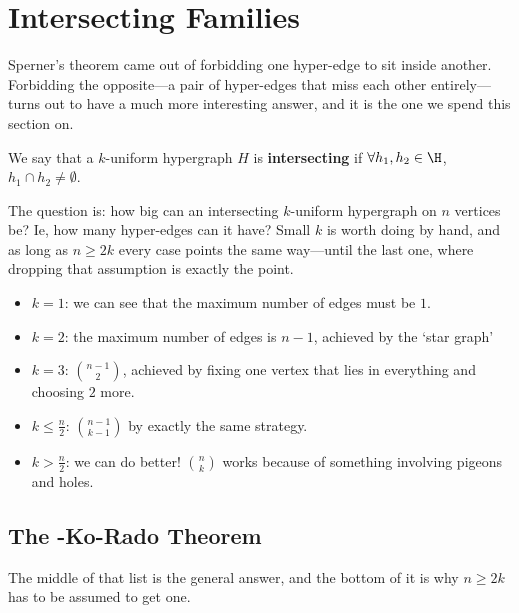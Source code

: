 \section{Intersecting Families}

Sperner's theorem came out of forbidding one hyper-edge to sit inside another. Forbidding the opposite---a pair of hyper-edges that miss each other entirely---turns out to have a much more interesting answer, and it is the one we spend this section on.

\begin{boxdefinition}[Intersecting]
    We say that a $k$-uniform hypergraph $H$ is \textbf{intersecting} if $\forall h_1, h_2 \in \H$, $h_1 \cap h_2 \ne \emptyset$.
\end{boxdefinition}

The question is: how big can an intersecting $k$-uniform hypergraph on $n$ vertices be? Ie, how many hyper-edges can it have? Small $k$ is worth doing by hand, and as long as $n \geq 2k$ every case points the same way---until the last one, where dropping that assumption is exactly the point.

\begin{itemize}
    \item $k = 1$: we can see that the maximum number of edges must be $1$.
    \item $k = 2$: the maximum number of edges is $n - 1$, achieved by the `star graph'
    \begin{center}
    \end{center}
    \item $k = 3$: $\binom{n-1}{2}$, achieved by fixing one vertex that lies in everything and choosing $2$ more.
    \item $k \leq \frac{n}{2}$: $\binom{n-1}{k-1}$ by exactly the same strategy.
    \item $k > \frac{n}{2}$: we can do better! $\binom{n}{k}$ works because of something involving pigeons and holes.
\end{itemize}

\subsection{The \protect\Erdos-Ko-Rado Theorem}

The middle of that list is the general answer, and the bottom of it is why $n \geq 2k$ has to be assumed to get one.


